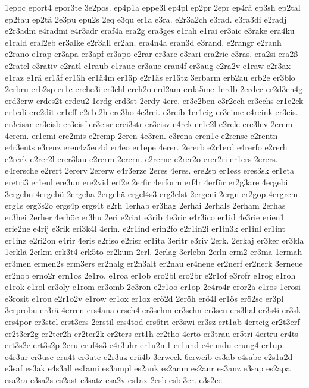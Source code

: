 {1epoc
eport4
epor3te
3e2pos.
ep4p1a
eppe3l
ep4pl
ep2pr
2epr
ep4rä
ep3sh
ep2tal
ep2tau
ep2tä
2e3pu
epu2s
2eq
e3qu
er1a
e3ra.
e2r3a2ch
e3rad.
e3ra3di
e2radj
e2r3adm
e4radmi
e4r3adr
eraf4a
era2g
era3ges
e1rah
e1rai
er3aic
e3rake
era4ku
e1rald
eral2eb
er3alke
e2r3all
er2an.
era4n4a
eran3d
e3rand.
e2rangr
e2ranh
e2rano
e1rap
er3apa
er3apf
er3apo
e2rar
er3are
e3rari
era2rie
e3ras.
era2si
era2ß
e2ratel
e3rativ
e2ratl
e1raub
e1rauc
er3aue
erau4f
er3aug
e2ra2v
e1raw
e2r3ax
e1raz
e1rä
er1äf
er1äh
er1ä4m
er1äp
e2r1äs
er1ätz
3erbarm
erb2au
erb2e
er3blo
2erbru
erb2sp
er1c
erche3i
er3chl
erch2o
erd2am
erda5me
1erdb
2erdec
er2d3en4g
erd3erw
erdes2t
erdeu2
1erdg
erd3st
2erdy
4ere.
er3e2ben
e3r2ech
er3echs
er1e2ck
er1edi
ere2dit
er1eff
e2r1e2h
ere3ho
4e3rei.
e3reib
1er1eig
er3eime
e4reink
er3eis.
er3eisar
er3eisb
er3eisf
er3eisr
erei3str
er3eisv
e4rek
er1e2l
e2rele
ere3lev
2erem
4erem.
er1emi
ere2mis
e2remp
2eren
4e3ren.
e3rena
eren1e
e2rense
e2rentn
e4r3ents
e3renz
eren4z5en4d
er4eo
er1epe
4erer.
2ererb
e2r1erd
e4rerfo
e2rerh
e2rerk
e2rer2l
erer3lau
e2rerm
2erern.
e2rerne
e2rer2o
erer2ri
er1ers
2erers.
e4rersche
e2rert
2ererv
2ererw
e4r3erze
2eres
4eres.
ere2sp
er1ess
eres3sk
er1eta
eretri3
er1eul
ere3un
ere2vid
erf2e
2erfir
4erform
erf4r
4erfür
er2g3are
4ergebi
3ergebn
4ergebü
2ergeha
2ergehä
ergel4s3
erg3elst
2ergeni
2ergn
er2gop
4ergrem
erg1s
erg3s2o
ergs4p
ergs4t
e2rh
1erhab
er3hag
2erhai
2erhals
2erham
2erhas
er3hei
2erher
4erhöc
er3hu
2eri
e2riat
e3rib
4e3ric
e4r3ico
er1id
4e3rie
erien1
erie2ne
e4rij
e3rik
eri3k4l
4erin.
e2r1ind
erin2fo
e2r1in2i
er1in3k
er1inl
er1int
er1inz
e2ri2on
e4rir
4eris
e2riso
e2risr
er1ita
3eritr
e3riv
2erk.
2erkaj
er3ker
er3kla
1erklä
2erkm
erk3t4
erk5to
er2kum
2erl.
2erlag
3erlebn
2erln
erm2
er3ma
1ermah
er3men
ermen2s
erm3ers
er2nalg
er2n3alt
er2nau
er4nene
er2nerf
er2nerk
3erneue
er2nob
erno2r
ern1os
2e1ro.
e1roa
er1ob
ero2bl
ero2br
e2r1of
e3rofr
e1rog
e1roh
e1rok
e1rol
er3oly
e1rom
er3omb
2e3ron
e2r1oo
er1op
2e4ro4r
eror2a
e1ros
1erosi
e3rosit
e1rou
e2r1o2v
e1row
er1ox
er1oz
erö2d
2eröh
erö4l
er1ös
erö2sc
er3pl
3erprobu
er3rä
4erren
ers4ana
ersch4
er3schm
er3schn
er3sen
ers3hal
er3s4i
er3sk
ers4por
er3stel
erst3ers
2erstil
ers4tod
ers6tri
er3swi
er3sz
ert1ab
4erteig
er2t3erf
er2t3er2g
er2ter2h
er2ter2k
er2ters
ert1h
er2tho
4ertö
er3trau
er5tri
4ertru
er4ts
ert3s2e
ert3s2p
2eru
eruf4s3
e4r3uhr
er1u2m1
er1und
e4rundu
erung4
er1up.
e4r3ur
er3use
eru4t
er3ute
e2r3uz
erü4b
3erweck
6erweib
es3ab
e4sabe
e2s1a2d
e3saf
es3ak
e4s3all
es1ami
es3ampl
es2ank
es2anm
es2anr
es3anz
e3sap
es2apa
esa2ra
e3sa2s
es2ast
e3satz
esa2v
es1ax
2esb
esbi3er.
e3s2ce
}
